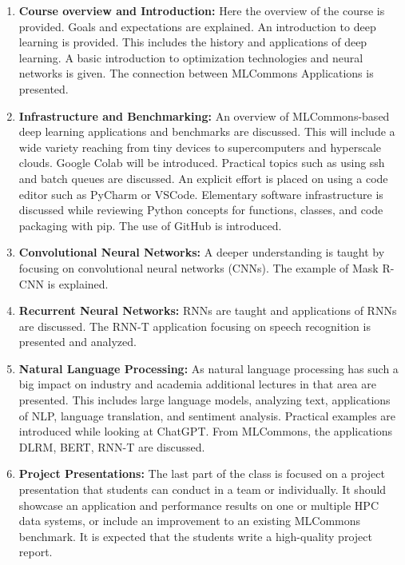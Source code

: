 \documentclass[utf8]{FrontiersinVancouver} %
\begin{document}
{\begin{enumerate}
  
\item{\bf Course overview and Introduction:} Here the overview of the
  course is provided. Goals and expectations are explained. An
  introduction to deep learning is provided. This includes the history
  and applications of deep learning. A basic introduction to
  optimization technologies and neural networks is given. The
  connection between MLCommons Applications is presented.

\item{\bf Infrastructure and Benchmarking:} An overview of
  MLCommons-based deep learning applications and benchmarks are
  discussed. This will include a wide variety reaching from tiny
  devices to supercomputers and hyperscale clouds. Google Colab will
  be introduced. Practical topics such as using ssh and batch queues
  are discussed. An explicit effort is placed on using a code editor
  such as PyCharm or VSCode. Elementary software infrastructure is
  discussed while reviewing Python concepts for functions, classes,
  and code packaging with pip. The use of GitHub is introduced.
  
\item{\bf Convolutional Neural Networks:} A deeper understanding is taught
  by focusing on convolutional neural networks (CNNs). The example of
  Mask R-CNN is explained.

\item{\bf Recurrent Neural Networks:} RNNs are taught and applications of
  RNNs are discussed. The RNN-T application focusing on speech
  recognition is presented and analyzed.

\item{\bf Natural Language Processing:} As natural language processing
  has such a big impact on industry and academia additional lectures
  in that area are presented. This includes large language models,
  analyzing text, applications of NLP, language translation, and
  sentiment analysis.  Practical examples are introduced while looking
  at ChatGPT. From MLCommons, the applications DLRM, BERT, RNN-T are
  discussed.

\item{\bf Project Presentations:} The last part of the class is
  focused on a project presentation that students can conduct in a
  team or individually. It should showcase an application and
  performance results on one or multiple HPC data systems, or include
  an improvement to an existing MLCommons benchmark. It is expected
  that the students write a high-quality project report.
  

\end{enumerate}}
\end{document}
